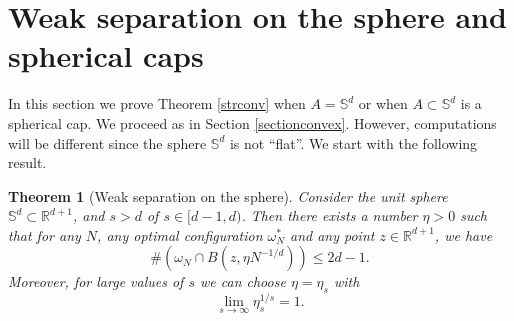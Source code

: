 \documentclass[12pt]{amsart}
\newtheorem{theorem}{Theorem}[section]
\theoremstyle{definition}
\def\R{\mathbb{R}}
\newcommand{\1}{\mathbf{1}}
\renewcommand\S{\mathbb{S}}
\begin{document}
\section{Weak separation on the sphere and spherical caps}\label{sectionsphere}
In this section we prove Theorem \ref{strconv} when $A=\S^d$ or when $A\subset \S^d$ is a spherical cap. We proceed as in Section \ref{sectionconvex}. However, computations will be different since the sphere $\S^d$ is not ``flat''. We start with the following result.
\begin{theorem}[Weak separation on the sphere] \label{weakseparsphere}
Consider the unit sphere $\S^d\subset \R^{d+1}$, and $s>d$ of $s\in [d-1,d)$. Then there exists a number $\eta>0$ such that for any $N$, any optimal configuration $\omega^*_N$ and any point $z\in \R^{d+1}$, we have
$$
\#(\omega_N \cap B(z, \eta N^{-1/d}))\leqslant 2d-1.
$$
Moreover, for large values of $s$ we can choose $\eta=\eta_s$ with
$$
\lim_{s\to \infty} \eta_s^{1/s} =1.
$$
\end{theorem}
\end{document}
